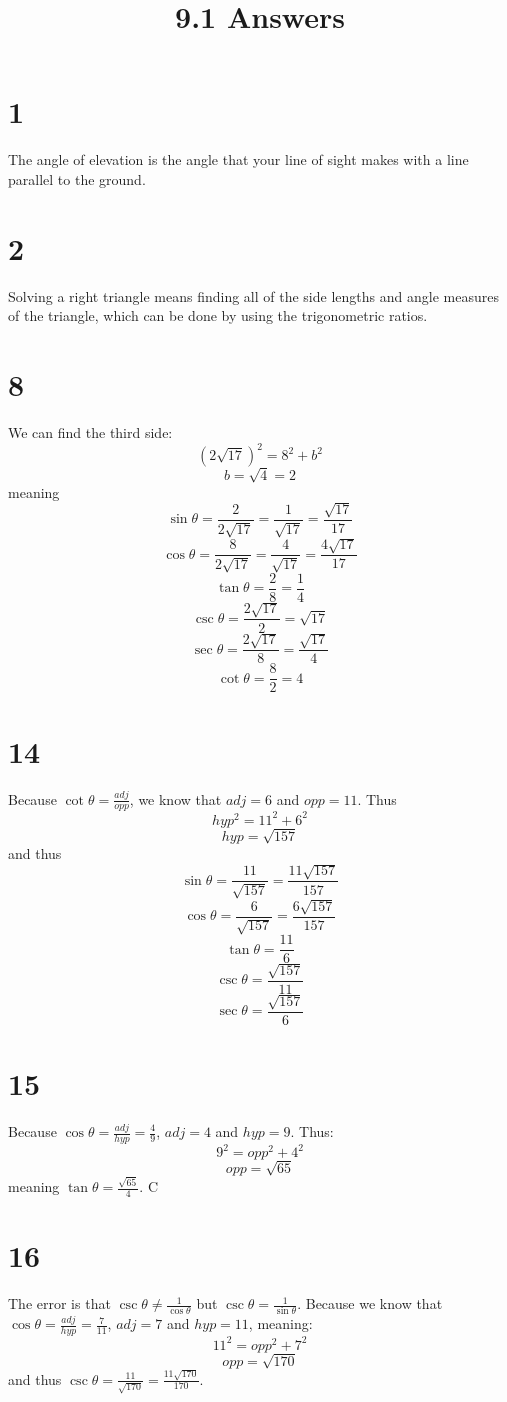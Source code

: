 \documentclass{article}
\title{9.1 Answers}
\theoremstyle{definition}
\newcommand{\?}{\stackrel{?}{=}}
\begin{document}
\maketitle

\section*{1}
The angle of elevation is the angle that your line of sight makes with a line parallel to the ground.

\section*{2}
Solving a right triangle means finding all of the side lengths and angle measures of the triangle, which can be done by using the trigonometric ratios.

\section*{8}
We can find the third side:
\[ (2\sqrt{17})^2=8^2+b^2 \]
\[ b=\sqrt{4}=2 \]
meaning \[ \sin\theta =\frac{2}{2\sqrt{17}}=\frac{1}{\sqrt{17}}=\frac{\sqrt{17}}{17} \]
\[ \cos\theta =\frac{8}{2\sqrt{17}}=\frac{4}{\sqrt{17}}=\frac{4\sqrt{17}}{17} \]
\[ \tan\theta =\frac{2}{8}=\frac{1}{4} \]
\[ \csc\theta =\frac{2\sqrt{17}}{2}=\sqrt{17} \]
\[ \sec\theta =\frac{2\sqrt{17}}{8}=\frac{\sqrt{17}}{4} \]
\[ \cot\theta =\frac{8}{2}=4 \]

\section*{14}
Because $\cot\theta=\frac{adj}{opp}$, we know that $adj=6$ and $opp=11$. Thus 
\[ hyp^2=11^2+6^2 \] \[ hyp=\sqrt{157} \]
and thus
\[ \sin\theta =\frac{11}{\sqrt{157}}=\frac{11\sqrt{157}}{157} \]
\[ \cos\theta =\frac{6}{\sqrt{157}}=\frac{6\sqrt{157}}{157} \]
\[ \tan\theta =\frac{11}{6} \]
\[ \csc\theta =\frac{\sqrt{157}}{11} \]
\[ \sec\theta =\frac{\sqrt{157}}{6} \]

\section*{15}
Because $\cos\theta =\frac{adj}{hyp}=\frac{4}{9}$, $adj=4$ and $hyp=9$. Thus:
\[ 9^2=opp^2+4^2 \]
\[ opp=\sqrt{65} \]
meaning $\tan\theta =\frac{\sqrt{65}}{4}$. C

\section*{16}
The error is that $\csc\theta\ne\frac{1}{\cos\theta}$ but $\csc\theta=\frac{1}{\sin\theta}$. 
Because we know that $\cos\theta =\frac{adj}{hyp}=\frac{7}{11}$, $adj=7$ and $hyp=11$, meaning:
\[ 11^2=opp^2+7^2 \] \[ opp=\sqrt{170} \]
and thus $\csc\theta=\frac{11}{\sqrt{170}}=\frac{11\sqrt{170}}{170}$.
\end{document}
